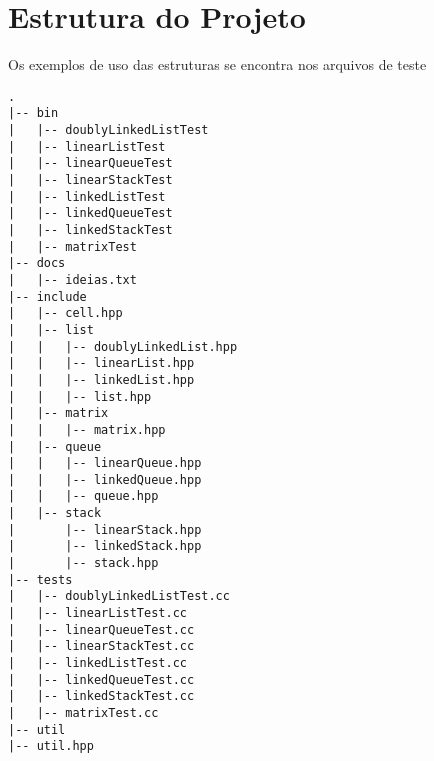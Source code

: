 \documentclass[12pt]{article}
\begin{document}
\section{Estrutura do Projeto}
Os exemplos de uso das estruturas se encontra nos arquivos de teste
\begin{verbatim}
.
|-- bin
|   |-- doublyLinkedListTest
|   |-- linearListTest
|   |-- linearQueueTest
|   |-- linearStackTest
|   |-- linkedListTest
|   |-- linkedQueueTest
|   |-- linkedStackTest
|   |-- matrixTest
|-- docs
|   |-- ideias.txt
|-- include
|   |-- cell.hpp
|   |-- list
|   |   |-- doublyLinkedList.hpp
|   |   |-- linearList.hpp
|   |   |-- linkedList.hpp
|   |   |-- list.hpp
|   |-- matrix
|   |   |-- matrix.hpp
|   |-- queue
|   |   |-- linearQueue.hpp
|   |   |-- linkedQueue.hpp
|   |   |-- queue.hpp
|   |-- stack
|       |-- linearStack.hpp
|       |-- linkedStack.hpp
|       |-- stack.hpp
|-- tests
|   |-- doublyLinkedListTest.cc
|   |-- linearListTest.cc
|   |-- linearQueueTest.cc
|   |-- linearStackTest.cc
|   |-- linkedListTest.cc
|   |-- linkedQueueTest.cc
|   |-- linkedStackTest.cc
|   |-- matrixTest.cc
|-- util
|-- util.hpp
\end{verbatim}
\end{document}
